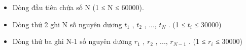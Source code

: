 \begin{itemize}
	\item     Dòng đầu tiên chứa số N (1 ≤ N ≤ 60000).   
	\item     Dòng thứ 2 ghi N số nguyên dương $t_{1}$    , $t_{2}$    , ...,   $t_{N}$    . (1 ≤ $t_{i}$    ≤ 30000)   
	\item     Dòng thứ ba ghi N-1 số nguyên dương $r_{1}$    , $r_{2}$    , ...,   $r_{N-1}$    . (1 ≤ $r_{i}$    ≤ 30000)   
\end{itemize}
